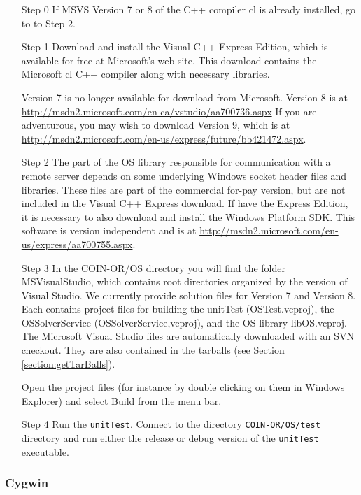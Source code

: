 \documentclass[11pt]{article}
\renewcommand{\_}{{\char"5F}}
\renewcommand{\{}{{\char"7B}}
\renewcommand{\}}{{\char"7D}}
\renewcommand{\^}{{\char"0D}}
\renewcommand{\'}{{\char"0D}}
\begin{document}
\begin{itemize}


\item[Step 0] If MSVS  Version 7 or 8 of  the C++ compiler cl is already installed,  go to  to Step 2.

\item[Step 1] Download and install the Visual C++ Express Edition, which is available for free at Microsoft's web site. This download contains the Microsoft cl C++ compiler along with necessary libraries.

Version 7 is no longer available for download from Microsoft.  Version 8 is at \url{http://msdn2.microsoft.com/en-ca/vstudio/aa700736.aspx}  If you are adventurous, you may wish to download Version 9, which is at
\url{http://msdn2.microsoft.com/en-us/express/future/bb421472.aspx}.


\item[Step 2] The part of the OS library responsible for communication with a remote server depends on some underlying Windows socket header files and libraries. These files are part of the commercial for-pay version, but are not included in the Visual C++ Express download. If  have the Express Edition, it is necessary to also download and install the Windows Platform SDK. This software is version independent and is at  \url{http://msdn2.microsoft.com/en-us/express/aa700755.aspx}.

\item[Step 3] In the COIN-OR/OS directory you will find the folder MSVisualStudio, which contains root directories organized by the version of Visual Studio. We currently provide solution files for Version 7 and Version 8. Each contains project files for building the unitTest (OSTest.vcproj), the OSSolverService (OSSolverService,vcproj),   and the OS library libOS.vcproj. The Microsoft Visual Studio files are automatically downloaded with an SVN checkout. They are also contained in the tarballs (see Section \ref{section:getTarBalls}).

Open the project files (for instance by double clicking on them in Windows Explorer)  and select Build from the menu bar.

\item[Step 4] Run the  {\tt unitTest}.  Connect  to the directory {\tt COIN-OR/OS/test} directory and run either the release or debug version of the  {\tt unitTest} executable. 
\end{itemize}

\subsubsection{Cygwin}
\end{document}

